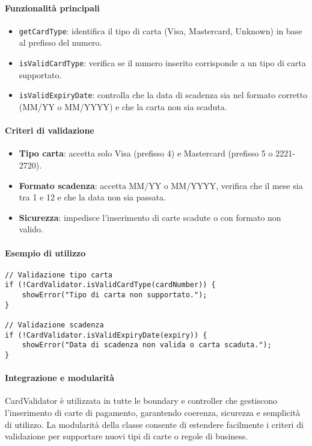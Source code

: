 \paragraph{Funzionalità principali}
\begin{itemize}
    \item \texttt{getCardType}: identifica il tipo di carta (Visa, Mastercard, Unknown) in base al prefisso del numero.
    \item \texttt{isValidCardType}: verifica se il numero inserito corrisponde a un tipo di carta supportato.
    \item \texttt{isValidExpiryDate}: controlla che la data di scadenza sia nel formato corretto (MM/YY o MM/YYYY) e che la carta non sia scaduta.
\end{itemize}

\paragraph{Criteri di validazione}
\begin{itemize}
    \item \textbf{Tipo carta}: accetta solo Visa (prefisso 4) e Mastercard (prefisso 5 o 2221-2720).
    \item \textbf{Formato scadenza}: accetta MM/YY o MM/YYYY, verifica che il mese sia tra 1 e 12 e che la data non sia passata.
    \item \textbf{Sicurezza}: impedisce l'inserimento di carte scadute o con formato non valido.
\end{itemize}

\paragraph{Esempio di utilizzo}
\begin{verbatim}
// Validazione tipo carta
if (!CardValidator.isValidCardType(cardNumber)) {
    showError("Tipo di carta non supportato.");
}

// Validazione scadenza
if (!CardValidator.isValidExpiryDate(expiry)) {
    showError("Data di scadenza non valida o carta scaduta.");
}
\end{verbatim}

\paragraph{Integrazione e modularità}
CardValidator è utilizzata in tutte le boundary e controller che gestiscono l'inserimento di carte di pagamento, garantendo coerenza, sicurezza e semplicità di utilizzo. La modularità della classe consente di estendere facilmente i criteri di validazione per supportare nuovi tipi di carte o regole di business.

